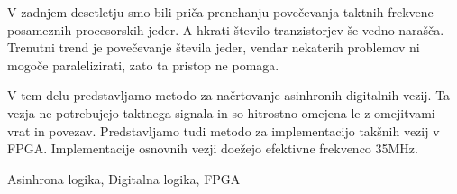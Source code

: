 \povzetek
V zadnjem desetletju smo bili priča prenehanju povečevanja taktnih frekvenc posameznih procesorskih jeder. A hkrati število tranzistorjev še vedno narašča. Trenutni trend je povečevanje števila jeder, vendar nekaterih problemov ni mogoče paralelizirati, zato ta pristop ne pomaga.

V tem delu predstavljamo metodo za načrtovanje asinhronih digitalnih vezij. Ta vezja ne potrebujejo taktnega signala in so hitrostno omejena le z omejitvami vrat in povezav. Predstavljamo tudi metodo za implementacijo takšnih vezij v FPGA. Implementacije osnovnih vezji doežejo efektivne frekvenco 35MHz.

\kljucnebesede
Asinhrona logika, Digitalna logika, FPGA
